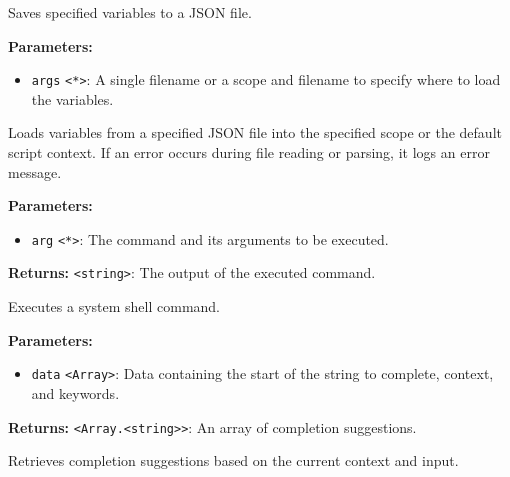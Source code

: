\documentclass[12pt,a4paper]{article}
\begin{document}
\noindent Saves specified variables to a JSON file.

\vspace{5mm}
\noindent {}


\noindent \textbf{Parameters:}
\begin{itemize}
  \item \texttt{args} \texttt{<*>}: A single filename or a scope and filename to specify where to load the variables.
\end{itemize}

\noindent Loads variables from a specified JSON file into the specified scope or the default script context.
If an error occurs during file reading or parsing, it logs an error message.

\vspace{5mm}
\noindent {}


\noindent \textbf{Parameters:}
\begin{itemize}
  \item \texttt{arg} \texttt{<*>}: The command and its arguments to be executed.
\end{itemize}

\noindent \textbf{Returns:} \texttt{<string>}: The output of the executed command.

\noindent Executes a system shell command.

\vspace{5mm}
\noindent {}


\noindent \textbf{Parameters:}
\begin{itemize}
  \item \texttt{data} \texttt{<Array>}: Data containing the start of the string to complete, context, and keywords.
\end{itemize}

\noindent \textbf{Returns:} \texttt{<Array.<string>>}: An array of completion suggestions.

\noindent Retrieves completion suggestions based on the current context and input.

\vspace{5mm}
\noindent {}
\end{document}
